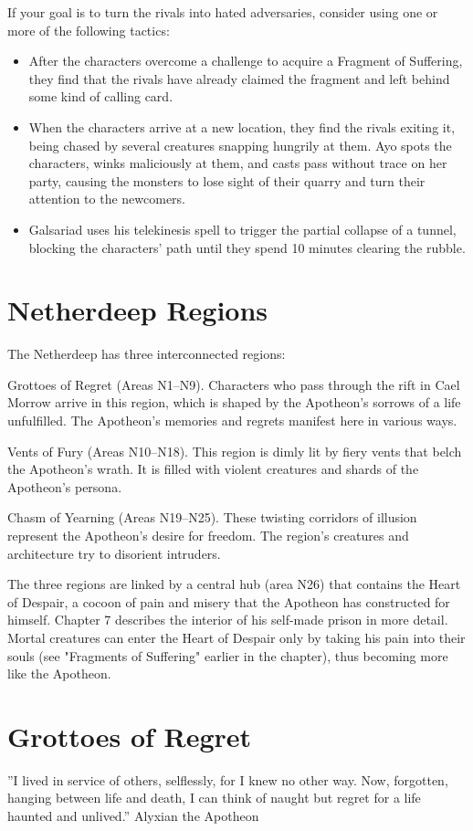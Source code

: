 \documentclass[10pt,a4paper,twoside,bg=print,twocolumn,openany,nodeprecatedcode]{dndbook}
\begin{document}
If your goal is to turn the rivals into hated adversaries, consider using one or more of the following tactics:


\begin{itemize}
\item After the characters overcome a challenge to acquire a Fragment of Suffering, they find that the rivals have already claimed the fragment and left behind some kind of calling card.
\item When the characters arrive at a new location, they find the rivals exiting it, being chased by several creatures snapping hungrily at them. Ayo spots the characters, winks maliciously at them, and casts pass without trace on her party, causing the monsters to lose sight of their quarry and turn their attention to the newcomers.
\item Galsariad uses his telekinesis spell to trigger the partial collapse of a tunnel, blocking the characters' path until they spend 10 minutes clearing the rubble.
\end{itemize}

\section{Netherdeep Regions}
The Netherdeep has three interconnected regions:

Grottoes of Regret (Areas N1–N9). Characters who pass through the rift in Cael Morrow arrive in this region, which is shaped by the Apotheon's sorrows of a life unfulfilled. The Apotheon's memories and regrets manifest here in various ways.

Vents of Fury (Areas N10–N18). This region is dimly lit by fiery vents that belch the Apotheon's wrath. It is filled with violent creatures and shards of the Apotheon's persona.

Chasm of Yearning (Areas N19–N25). These twisting corridors of illusion represent the Apotheon's desire for freedom. The region's creatures and architecture try to disorient intruders.

The three regions are linked by a central hub (area N26) that contains the Heart of Despair, a cocoon of pain and misery that the Apotheon has constructed for himself. Chapter 7 describes the interior of his self-made prison in more detail. Mortal creatures can enter the Heart of Despair only by taking his pain into their souls (see "Fragments of Suffering" earlier in the chapter), thus becoming more like the Apotheon.

\section{Grottoes of Regret}
\DndQuote%
{}
{''I lived in service of others, selflessly, for I knew no other way. Now, forgotten, hanging between life and death, I can think of naught but regret for a life haunted and unlived.''}
{Alyxian the Apotheon}
\end{document}
